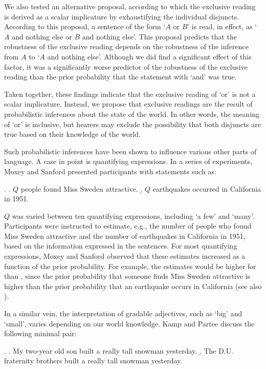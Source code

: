 \documentclass[12pt]{article}
\begin{document}
We also tested an alternative proposal, according to which the exclusive reading is derived as a scalar implicature by exhaustifying the individual disjuncts. According to this proposal, a sentence of the form `$A$ or $B$' is read, in effect, as `$A$ and nothing else or $B$ and nothing else'. This proposal predicts that the robustness of the exclusive reading depends on the robustness of the inference from $A$ to `$A$ and nothing else'. Although we did find a significant effect of this factor, it was a significantly worse predictor of the robustness of the exclusive reading than the prior probability that the statement with `and' was true. 

Taken together, these findings indicate that the exclusive reading of `or' is not a scalar implicature. Instead, we propose that exclusive readings are the result of probabilistic inferences about the state of the world. In other words, the meaning of `or' is inclusive, but hearers may exclude the possibility that both disjuncts are true based on their knowledge of the world.

Such probabilistic inferences have been shown to influence various other parts of language. A case in point is quantifying expressions. In a series of experiments, Moxey and Sanford \citeyearpar{moxey1993} presented participants with statements such as:

\ex.	\a. $Q$ people found Miss Sweden attractive.
	\b. $Q$ earthquakes occurred in California in 1951.
	
$Q$ was varied between ten quantifying expressions, including `a few' and `many'. Participants were instructed to estimate, e.g., the number of people who found Miss Sweden attractive and the number of earthquakes in California in 1951, based on the information expressed in the sentences. For most quantifying expressions, Moxey and Sanford observed that these estimates increased as a function of the prior probability. For example, the estimates would be higher for \Last[a] than \Last[b], since the prior probability that someone finds Miss Sweden attractive is higher than the prior probability that an earthquake occurs in California (see also \citealt{pepper1974}).

In a similar vein, the interpretation of gradable adjectives, such as `big' and `small', varies depending on our world knowledge. Kamp and Partee \citeyearpar{kamp1995} discuss the following minimal pair:

\ex.	\a. My two-year old son built a really tall snowman yesterday.
	\b. The D.U. fraternity brothers built a really tall snowman yesterday.
	
\end{document}
